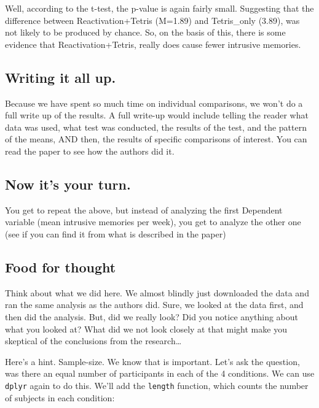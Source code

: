 \documentclass[]{book}
\theoremstyle{definition}
\theoremstyle{definition}
\theoremstyle{definition}
\theoremstyle{remark}
\begin{document}
Well, according to the t-test, the p-value is again fairly small.
Suggesting that the difference between Reactivation+Tetris (M=1.89) and
Tetris\_only (3.89), was not likely to be produced by chance. So, on the
basis of this, there is some evidence that Reactivation+Tetris, really
does cause fewer intrusive memories.

\subsection{Writing it all up.}\label{writing-it-all-up.}

Because we have spent so much time on individual comparisons, we won't
do a full write up of the results. A full write-up would include telling
the reader what data was used, what test was conducted, the results of
the test, and the pattern of the means, AND then, the results of
specific comparisons of interest. You can read the paper to see how the
authors did it.

\subsection{Now it's your turn.}\label{now-its-your-turn.}

You get to repeat the above, but instead of analyzing the first
Dependent variable (mean intrusive memories per week), you get to
analyze the other one (see if you can find it from what is described in
the paper)

\subsection{Food for thought}\label{food-for-thought}

Think about what we did here. We almost blindly just downloaded the data
and ran the same analysis as the authors did. Sure, we looked at the
data first, and then did the analysis. But, did we really look? Did you
notice anything about what you looked at? What did we not look closely
at that might make you skeptical of the conclusions from the
research\ldots{}

Here's a hint. Sample-size. We know that is important. Let's ask the
question, was there an equal number of participants in each of the 4
conditions. We can use \texttt{dplyr} again to do this. We'll add the
\texttt{length} function, which counts the number of subjects in each
condition:
\end{document}
